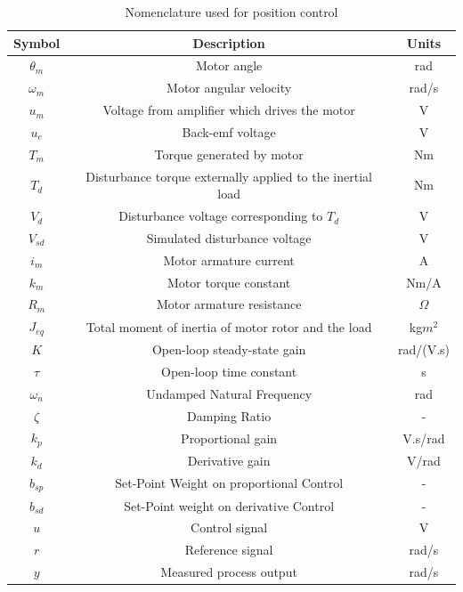\documentclass{article}
\begin{document}
\begin{table}[h]
    \centering
    \begin{tabular}{|c|c|c|}
        \hline
        \textbf{Symbol} & \textbf{Description} & \textbf{Units} \\
        \hline
        $\theta_m$ & Motor angle & rad \\
        $\omega_m$ & Motor angular velocity & rad/s \\
        $u_m$ & Voltage from amplifier which drives the motor & V \\
        $u_e$ & Back-emf voltage & V \\
        $T_m$ & Torque generated by motor & Nm \\
        $T_d$ & Disturbance torque externally applied to the inertial load & Nm \\
        $V_d$ & Disturbance voltage corresponding to $T_d$ & V \\
        $V_{sd}$ & Simulated disturbance voltage & V \\
        $i_m$ & Motor armature current & A \\
        $k_m$ & Motor torque constant & Nm/A \\
        $R_m$ & Motor armature resistance & $\Omega$ \\
        $J_{eq}$ & Total moment of inertia of motor rotor and the load & kg$m^2$ \\
        $K$ & Open-loop steady-state gain & rad/(V.s) \\
        $\tau$ & Open-loop time constant & s \\
        $\omega_n$ & Undamped Natural Frequency & rad \\
        $\zeta$ & Damping Ratio & - \\
        $k_p$ & Proportional gain & V.s/rad \\
        $k_d$ & Derivative gain & V/rad \\
        $b_{sp}$ & Set-Point Weight on proportional Control & - \\
        $b_{sd}$ & Set-Point weight on derivative Control & - \\
        $u$ & Control signal & V \\
        $r$ & Reference signal & rad/s \\
        $y$ & Measured process output & rad/s \\
        \hline
    \end{tabular}
    \caption{Nomenclature used for position control}
\end{table}
\end{document}
